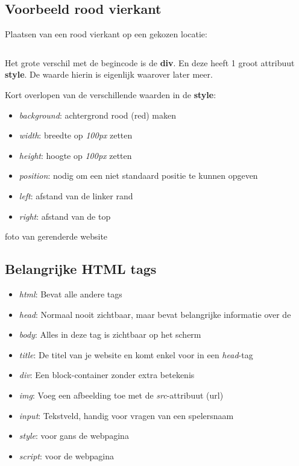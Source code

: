 \subsection{Voorbeeld rood vierkant}%
\label{sub:voorbeeld_rood_vierkant}

Plaatsen van een rood vierkant op een gekozen locatie:
\inputminted{html}{../cheatsheet/pos_div.html}

Het grote verschil met de begincode is de \textbf{div}. En deze heeft 1 groot attribuut \textbf{style}. De waarde hierin is eigenlijk \CSS waarover later meer.

Kort overlopen van de verschillende waarden in de \textbf{style}:
\begin{itemize}
    \item \emph{background}: achtergrond rood (red) maken
    \item \emph{width}: breedte op \emph{100px} zetten
    \item \emph{height}: hoogte op \emph{100px} zetten
    \item \emph{position}: nodig om een niet standaard positie te kunnen opgeven
    \item \emph{left}: afstand van de linker rand
    \item \emph{right}: afstand van de top
\end{itemize}

\TODO foto van gerenderde website

\subsection{Belangrijke HTML tags}%
\label{sub:belangrijke_html_tags}

\begin{itemize}
    \item \emph{html}: Bevat alle andere \HTML tags
    \item \emph{head}: Normaal nooit zichtbaar, maar bevat belangrijke informatie over de \HTML
    \item \emph{body}: Alles in deze tag is zichtbaar op het scherm
    \item \emph{title}: De titel van je website en komt enkel voor in een \emph{head}-tag
    \item \emph{div}: Een block-container zonder extra betekenis
    \item \emph{img}: Voeg een afbeelding toe met de \emph{src}-attribuut (url)
    \item \emph{input}: Tekstveld, handig voor vragen van een spelersnaam
    \item \emph{style}: \CSS voor gans de webpagina
    \item \emph{script}: \JS voor de webpagina
\end{itemize}


